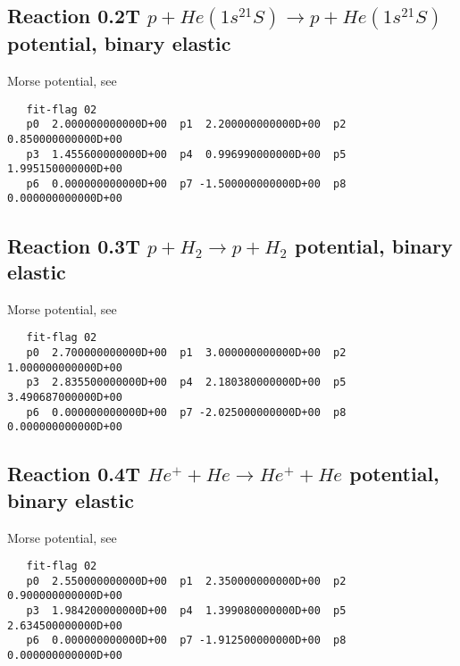 \documentclass[12pt,dvipdfmx]{article}
\begin{document}
\newpage

\subsection{
Reaction 0.2T   $ p + He(1s^21S) \rightarrow p + He(1s^21S) $
potential, binary elastic}

Morse potential, see \cite{kn:Bachmann}

\begin{small}\begin{verbatim}
   fit-flag 02
   p0  2.000000000000D+00  p1  2.200000000000D+00  p2  0.850000000000D+00
   p3  1.455600000000D+00  p4  0.996990000000D+00  p5  1.995150000000D+00
   p6  0.000000000000D+00  p7 -1.500000000000D+00  p8  0.000000000000D+00
\end{verbatim}\end{small}


\newpage

\subsection{
Reaction 0.3T    $p + H_2 \rightarrow p + H_2 $ potential, binary elastic
}

Morse potential, see \cite{kn:Bachmann}
\begin{small}\begin{verbatim}
   fit-flag 02
   p0  2.700000000000D+00  p1  3.000000000000D+00  p2  1.000000000000D+00
   p3  2.835500000000D+00  p4  2.180380000000D+00  p5  3.490687000000D+00
   p6  0.000000000000D+00  p7 -2.025000000000D+00  p8  0.000000000000D+00
\end{verbatim}\end{small}


\newpage

\subsection{
Reaction 0.4T   $  He^+ + He \rightarrow He^+ + He $ potential, binary elastic
}

Morse potential, see \cite{kn:Bachmann}
\begin{small}\begin{verbatim}
   fit-flag 02
   p0  2.550000000000D+00  p1  2.350000000000D+00  p2  0.900000000000D+00
   p3  1.984200000000D+00  p4  1.399080000000D+00  p5  2.634500000000D+00
   p6  0.000000000000D+00  p7 -1.912500000000D+00  p8  0.000000000000D+00
\end{verbatim}\end{small}
\end{document}
